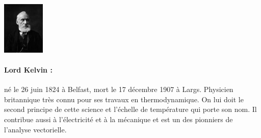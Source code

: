 \begin{minipage}{0.2\linewidth}
\begin{center}\includegraphics[width=2cm]{images/Kelvin.jpg}\end{center}
\end{minipage}
\begin{minipage}{0.80\linewidth}
\small{\paragraph*{Lord Kelvin :} né le 26 juin 1824 à Belfast, mort le 17 décembre 1907 à
Largs. Physicien britannique très connu pour ses travaux en thermodynamique. On lui doit le second principe de cette science et l'échelle de température qui porte son nom. Il contribue aussi à l'électricité et à la mécanique et est un des pionniers de l'analyse vectorielle. }
\end{minipage}
